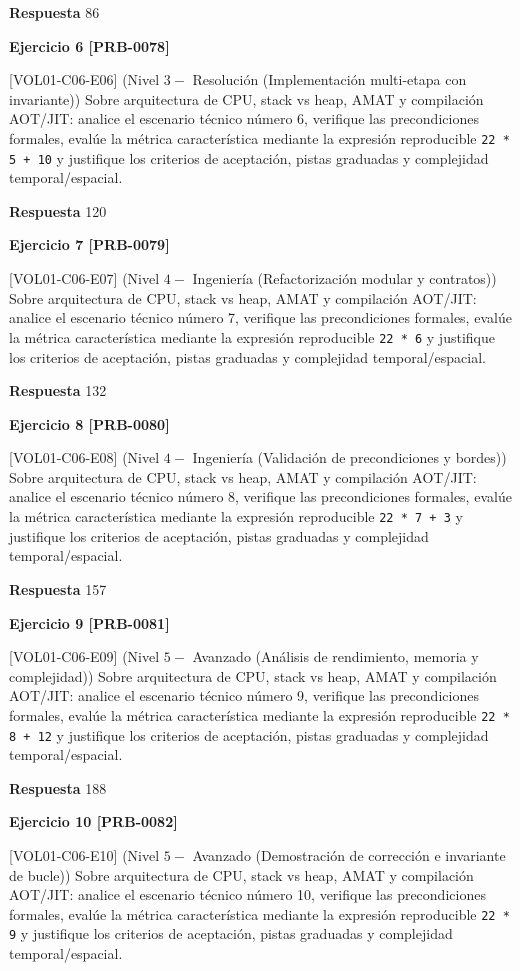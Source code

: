 \documentclass{book}
\begin{document}
\noindent\textbf{Respuesta} 86

\noindent\textbf{Ejercicio 6 [PRB-0078]}

[VOL01-C06-E06] (Nivel \(3 -\) Resolución (Implementación multi-etapa con invariante)) Sobre arquitectura de CPU, stack vs heap, AMAT y compilación AOT/JIT: analice el escenario técnico número 6, verifique las precondiciones formales, evalúe la métrica característica mediante la expresión reproducible \texttt{22 * 5 + 10} y justifique los criterios de aceptación, pistas graduadas y complejidad temporal/espacial.

\noindent\textbf{Respuesta} 120

\noindent\textbf{Ejercicio 7 [PRB-0079]}

[VOL01-C06-E07] (Nivel \(4 -\) Ingeniería (Refactorización modular y contratos)) Sobre arquitectura de CPU, stack vs heap, AMAT y compilación AOT/JIT: analice el escenario técnico número 7, verifique las precondiciones formales, evalúe la métrica característica mediante la expresión reproducible \texttt{22 * 6} y justifique los criterios de aceptación, pistas graduadas y complejidad temporal/espacial.

\noindent\textbf{Respuesta} 132

\noindent\textbf{Ejercicio 8 [PRB-0080]}

[VOL01-C06-E08] (Nivel \(4 -\) Ingeniería (Validación de precondiciones y bordes)) Sobre arquitectura de CPU, stack vs heap, AMAT y compilación AOT/JIT: analice el escenario técnico número 8, verifique las precondiciones formales, evalúe la métrica característica mediante la expresión reproducible \texttt{22 * 7 + 3} y justifique los criterios de aceptación, pistas graduadas y complejidad temporal/espacial.

\noindent\textbf{Respuesta} 157

\noindent\textbf{Ejercicio 9 [PRB-0081]}

[VOL01-C06-E09] (Nivel \(5 -\) Avanzado (Análisis de rendimiento, memoria y complejidad)) Sobre arquitectura de CPU, stack vs heap, AMAT y compilación AOT/JIT: analice el escenario técnico número 9, verifique las precondiciones formales, evalúe la métrica característica mediante la expresión reproducible \texttt{22 * 8 + 12} y justifique los criterios de aceptación, pistas graduadas y complejidad temporal/espacial.

\noindent\textbf{Respuesta} 188

\noindent\textbf{Ejercicio 10 [PRB-0082]}

[VOL01-C06-E10] (Nivel \(5 -\) Avanzado (Demostración de corrección e invariante de bucle)) Sobre arquitectura de CPU, stack vs heap, AMAT y compilación AOT/JIT: analice el escenario técnico número 10, verifique las precondiciones formales, evalúe la métrica característica mediante la expresión reproducible \texttt{22 * 9} y justifique los criterios de aceptación, pistas graduadas y complejidad temporal/espacial.
\end{document}
